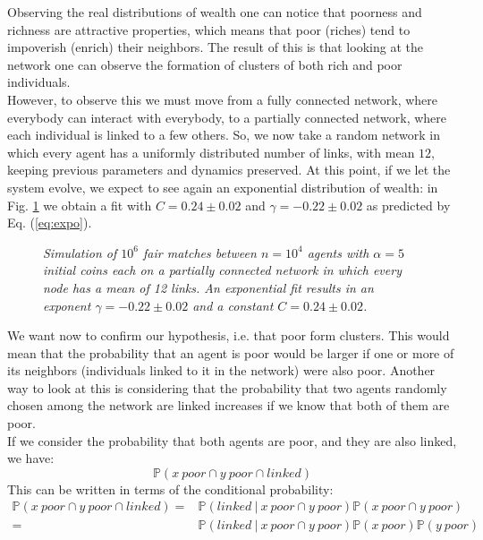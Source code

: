 Observing the real distributions of wealth one can notice that poorness and richness are attractive properties, which means that poor (riches) tend to impoverish (enrich) their neighbors.
The result of this is that looking at the network one can observe the formation of clusters of both rich and poor individuals. \\
However, to observe this we must move from a fully connected network, where everybody can interact with everybody, to a partially connected network, where each individual is linked to a few others.
So, we now take a random network in which every agent has a uniformly distributed number of links, with mean $12$, keeping previous parameters and dynamics preserved.
At this point, if we let the system evolve, we expect to see again an exponential distribution of wealth: in Fig. \ref{fig:fixedExpo} we obtain a fit with $C = 0.24 \pm 0.02$ and $\gamma = -0.22 \pm 0.02$ as predicted by Eq. (\ref{eq:expo}).
\begin{figure}[H]
    \centering
    \scalebox{.7}{}
    \caption{\emph{Simulation of $10^6$ fair matches between $n = 10^4$ agents  with $\alpha = 5$ initial coins each on a partially connected network in which every node has a mean of 12 links. 
                    An exponential fit results in an exponent $\gamma = -0.22 \pm 0.02$ and a constant $C = 0.24 \pm 0.02$.}}
    \label{fig:fixedExpo}
\end{figure}
We want now to confirm our hypothesis, i.e. that poor form clusters.
This would mean that the probability that an agent is poor would be larger if one or more of its neighbors (individuals linked to it in the network) were also poor.
Another way to look at this is considering that the probability that two agents randomly chosen among the network are linked increases if we know that both of them are poor. \\
If we consider the probability that both agents are poor, and they are also linked, we have:
\begin{equation*}
    \mathbb{P}(x \ poor \cap y \ poor \cap linked)
\end{equation*}
This can be written in terms of the conditional probability:
\begin{equation*}
    \begin{split}
        \mathbb{P}(x \ poor \cap y \ poor \cap linked) =& \mathbb{P}(linked \ \vert \ x \ poor \cap y \ poor) \mathbb{P}(x \ poor \cap y \ poor)\\
	                                                   =& \mathbb{P}(linked \ \vert \ x \ poor \cap y \ poor) \mathbb{P}(x \ poor)\mathbb{P}(y \ poor)
    \end{split}
\end{equation*}
